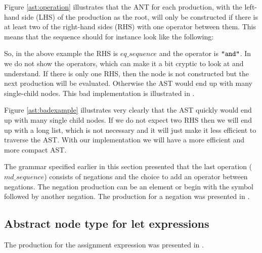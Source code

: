 Figure \ref{ast:operation} illustrates that the ANT for each production, with
the left-hand side (LHS) of the production as the root, will only be constructed
if there is at least two of the right-hand sides (RHS) with one operator between
them. This means that the sequence should for instance look like the following:

\begin{ebnf}
\end{ebnf}

So, in the above example the RHS is $eq\_sequence$ and the operator is
$\texttt{"and"}$. In  we do not show the operators, which can
make it a bit cryptic to look at and understand. If there is only one RHS, then
the node is not constructed but the next production will be evaluated. Otherwise
the AST would end up with many single-child nodes. This bad implementation is 
illustrated in .



Figure \ref{ast:badexample} illustrates very clearly that the AST quickly would
end up with many single child nodes. If we do not expect two RHS then we will 
end up with a long list, which is not necessary and it will just make it less 
efficient to traverse the AST. With our implementation we will have a more efficient 
and more compact AST.

The grammar specified earlier in this section presented that the last operation
($md\_sequence$) consists of negations and the choice to add an operator between
negations. The negation production can be an element or begin with the \gter{-}
symbol followed by another negation. The production for a negation was presented
in .


\subsection{Abstract node type for let expressions}
The production for the assignment expression was presented in
.



